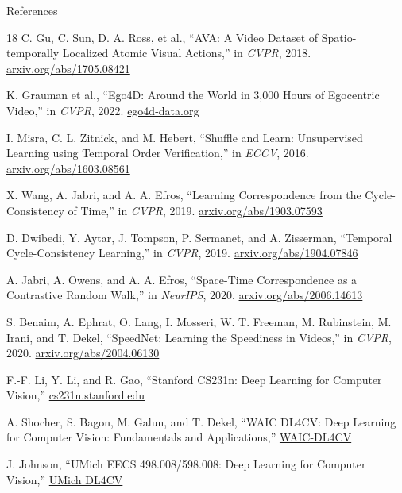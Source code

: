 \begin{frame}[allowframebreaks]{References}
\begin{thebibliography}{18}
        C. Gu, C. Sun, D. A. Ross, et al.,
        \newblock ``AVA: A Video Dataset of Spatio-temporally Localized Atomic Visual Actions,''
        \newblock in \emph{CVPR}, 2018.
        \newblock \href{https://arxiv.org/abs/1705.08421}{arxiv.org/abs/1705.08421}

        K. Grauman et al.,
        \newblock ``Ego4D: Around the World in 3,000 Hours of Egocentric Video,''
        \newblock in \emph{CVPR}, 2022.
        \newblock \href{https://ego4d-data.org/}{ego4d-data.org}

        I. Misra, C. L. Zitnick, and M. Hebert,
        \newblock ``Shuffle and Learn: Unsupervised Learning using Temporal Order Verification,''
        \newblock in \emph{ECCV}, 2016.
        \newblock \href{https://arxiv.org/abs/1603.08561}{arxiv.org/abs/1603.08561}

        X. Wang, A. Jabri, and A. A. Efros,
        \newblock ``Learning Correspondence from the Cycle-Consistency of Time,''
        \newblock in \emph{CVPR}, 2019.
        \newblock \href{https://arxiv.org/abs/1903.07593}{arxiv.org/abs/1903.07593}

        D. Dwibedi, Y. Aytar, J. Tompson, P. Sermanet, and A. Zisserman,
        \newblock ``Temporal Cycle-Consistency Learning,''
        \newblock in \emph{CVPR}, 2019.
        \newblock \href{https://arxiv.org/abs/1904.07846}{arxiv.org/abs/1904.07846}

        A. Jabri, A. Owens, and A. A. Efros,
        \newblock ``Space-Time Correspondence as a Contrastive Random Walk,''
        \newblock in \emph{NeurIPS}, 2020.
        \newblock \href{https://arxiv.org/abs/2006.14613}{arxiv.org/abs/2006.14613}

        S. Benaim, A. Ephrat, O. Lang, I. Mosseri, W. T. Freeman, M. Rubinstein, M. Irani, and T. Dekel,
        \newblock ``SpeedNet: Learning the Speediness in Videos,''
        \newblock in \emph{CVPR}, 2020.
        \newblock \href{https://arxiv.org/abs/2004.06130}{arxiv.org/abs/2004.06130}

        F.-F. Li, Y. Li, and R. Gao,
        \newblock ``Stanford CS231n: Deep Learning for Computer Vision,''
        \newblock \href{https://cs231n.stanford.edu/}{cs231n.stanford.edu}

        A. Shocher, S. Bagon, M. Galun, and T. Dekel,
        \newblock ``WAIC DL4CV: Deep Learning for Computer Vision: Fundamentals and Applications,''
        \newblock \href{https://dl4cv.github.io/}{WAIC-DL4CV}

        J. Johnson,
        \newblock ``UMich EECS 498.008/598.008: Deep Learning for Computer Vision,''
        \newblock \href{https://web.eecs.umich.edu/~justincj/teaching/eecs498/WI2022/}{UMich DL4CV}
    \end{thebibliography}
\end{frame}
